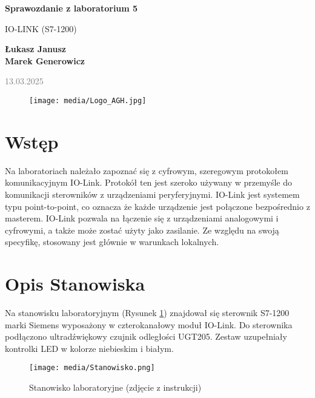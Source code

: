 \documentclass{article}
\begin{document}
\begin{titlepage}
    \begin{center}
        \vspace*{1cm}
            
        \Huge
        \textbf{Sprawozdanie z laboratorium 5}
            
        \vspace{0.5cm}
        \LARGE
        IO-LINK (S7-1200) 
            
        \vspace{1.5cm}
            
        \textbf{Łukasz Janusz\\Marek Generowicz}

        \normalsize      
        \textcolor{gray}{13.03.2025}
        \vfill
        \begin{figure}[hb]
            \centering
            \texttt{[image: media/Logo\_AGH.jpg]}
        \end{figure}   
    \end{center}
\end{titlepage}

\section{Wstęp}
Na laboratoriach należało zapoznać się z cyfrowym, szeregowym protokołem komunikacyjnym IO-Link. Protokół ten jest szeroko używany w przemyśle do komunikacji sterowników z urządzeniami peryferyjnymi. IO-Link jest systemem typu point-to-point, co oznacza że każde urządzenie jest połączone bezpośrednio z masterem. IO-Link pozwala na łączenie się z urządzeniami analogowymi i cyfrowymi, a także może zostać użyty jako zasilanie. Ze względu na swoją specyfikę, stosowany jest głównie w warunkach lokalnych. 

\section{Opis Stanowiska}
Na stanowisku laboratoryjnym (Rysunek \ref{fig:stanowisko}) znajdował się sterownik S7-1200 marki Siemens wyposażony w czterokanałowy moduł IO-Link. Do sterownika podłączono ultradźwiękowy czujnik odległości UGT205. Zestaw uzupełniały kontrolki LED w kolorze niebieskim i białym. 
\begin{figure}[H]
    \centering
    \texttt{[image: media/Stanowisko.png]}
    \caption{Stanowisko laboratoryjne (zdjęcie z instrukcji)}
    \label{fig:stanowisko}
\end{figure}
\end{document}
